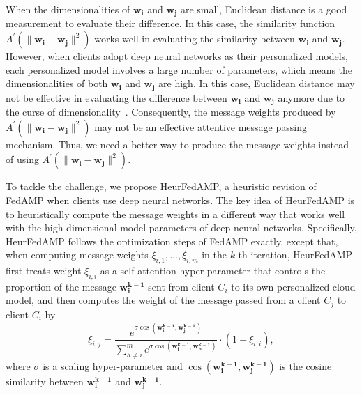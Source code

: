 When the dimensionalities of $\mathbf{w_i}$ and $\mathbf{w_j}$ are small, Euclidean distance is a good measurement to evaluate their difference. In this case, the similarity function $A^\prime(\|\mathbf{w_i} - \mathbf{w_j}\|^2)$ works well in evaluating the similarity between $\mathbf{w_i}$ and $\mathbf{w_j}$. %
%
However, when clients adopt deep neural networks as their personalized models, each personalized model involves a large number of parameters, which means the dimensionalities of both $\mathbf{w_i}$ and $\mathbf{w_j}$ are high.
In this case, Euclidean distance may not be effective in evaluating the difference between $\mathbf{w_i}$ and $\mathbf{w_j}$ anymore due to the curse of dimensionality~\cite{verleysen2005curse}. Consequently, the message weights produced by $A^\prime(\|\mathbf{w_i} - \mathbf{w_j}\|^2)$ may not be an effective attentive message passing mechanism.  Thus, we need a better way to produce the message weights instead of using $A^\prime(\|\mathbf{w_i} - \mathbf{w_j}\|^2)$.

To tackle the challenge, we propose HeurFedAMP, a heuristic revision of FedAMP when clients use deep neural networks.
The key idea of HeurFedAMP is to heuristically compute the message weights in a different way that works well with the high-dimensional model parameters of deep neural networks. %
Specifically, HeurFedAMP follows the optimization steps of FedAMP exactly, except that, when computing message weights $\xi_{i,1}, \ldots, \xi_{i,m}$ in the $k$-th iteration, HeurFedAMP first treats weight $\xi_{i,i}$ as a self-attention hyper-parameter that controls the proportion of the message $\mathbf{w_i^{k-1}}$ sent from client $C_i$ to its own personalized cloud model, and then computes the weight of the message passed from a client $C_j$ to client $C_i$ by
\begin{equation}
\label{eq:heurweights}
\xi_{i,j} = \frac{e^{\sigma\cos(\mathbf{w_i^{k-1}},\mathbf{w_j^{k-1}})}}
{\sum_{h\neq i}^m e^{\sigma\cos(\mathbf{w_i^{k-1}},\mathbf{w_h^{k-1}})}}\cdot (1-\xi_{i,i}),
\end{equation}
where $\sigma$ is a scaling hyper-parameter and $\cos(\mathbf{w_i^{k-1}},\mathbf{w_j^{k-1}})$ is the cosine similarity between $\mathbf{w_i^{k-1}}$ and $\mathbf{w_j^{k-1}}$.



